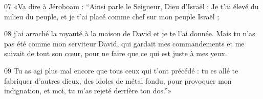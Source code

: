 
07 «Va dire à Jéroboam : “Ainsi parle le Seigneur, Dieu d’Israël : Je t’ai élevé du milieu du peuple, et je t’ai placé comme chef sur mon peuple Israël ;

08 j’ai arraché la royauté à la maison de David et je te l’ai donnée. Mais tu n’as pas été comme mon serviteur David, qui gardait mes commandements et me suivait de tout son cœur, pour ne faire que ce qui est juste à mes yeux.

09 Tu as agi plus mal encore que tous ceux qui t’ont précédé : tu es allé te fabriquer d’autres dieux, des idoles de métal fondu, pour provoquer mon indignation, et moi, tu m’as rejeté derrière ton dos.”»
